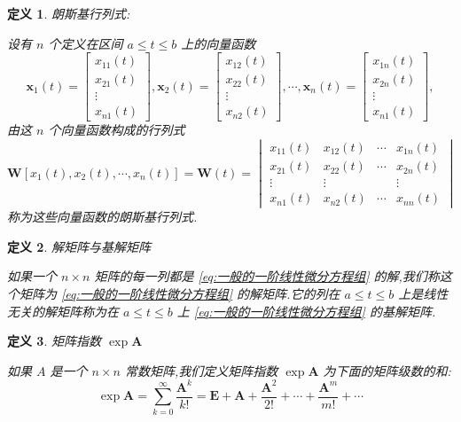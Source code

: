 \documentclass{ctexart}
\newtheorem{definition}{定义}[section]
\numberwithin{equation}{subsection}
\begin{document}
\begin{definition}朗斯基行列式:

        设有 $n$ 个定义在区间 $a\leqslant t\leqslant b$ 上的向量函数
        \[\boldsymbol{x}_{1}(t)=\left[\begin{array}{c}x_{11}(t) \\ x_{21}(t) \\ \vdots \\ x_{n 1}(t)\end{array}\right], \boldsymbol{x}_{2}(t)=\left[\begin{array}{c}x_{12}(t) \\ x_{22}(t) \\ \vdots \\ x_{n 2}(t)\end{array}\right], \cdots, \boldsymbol{x}_{n}(t)=\left[\begin{array}{c}x_{1 n}(t) \\ x_{2 n}(t) \\ \vdots \\ x_{n1}(t)\end{array}\right],\]
由这 $n$ 个向量函数构成的行列式
\[ \boldsymbol{W}\left[x_{1}(t), x_{2}(t), \cdots, x_{n}(t)\right]
=\boldsymbol{W}(t)=\begin{vmatrix}x_{11}(t) & x_{12}(t) & \cdots & x_{1 n}(t) \\ x_{21}(t) & x_{22}(t) & \cdots & x_{2 n}(t) \\ \vdots & \vdots & & \vdots \\ x_{n 1}(t) & x_{n 2}(t) & \cdots & x_{n n}(t)\end{vmatrix}\]
称为这些向量函数的朗斯基行列式.
\end{definition}
\begin{definition}解矩阵与基解矩阵
        
        如果一个 $n\times n$ 矩阵的每一列都是 \eqref{eq:一般的一阶线性微分方程组} 的解,我们称这个矩阵为 \eqref{eq:一般的一阶线性微分方程组} 的解矩阵.它的列在 $a\leqslant t\leqslant b$ 上是线性无关的解矩阵称为在 $a\leqslant t\leqslant b$ 上 \eqref{eq:一般的一阶线性微分方程组} 的基解矩阵.

\end{definition}
\begin{definition}矩阵指数 $\exp\boldsymbol{A}$

        如果 $A$ 是一个 $n\times n$ 常数矩阵,我们定义矩阵指数 $\exp\boldsymbol{A}$ 为下面的矩阵级数的和:\textcolor[rgb]{1,0,0}{
        \[
\exp \boldsymbol{A}=\sum_{k=0}^{\infty} \frac{\boldsymbol{A}^{k}}{k !}=\boldsymbol{E}+\boldsymbol{A}+\frac{\boldsymbol{A}^{2}}{2 !}+\cdots+\frac{\boldsymbol{A}^{m}}{m !}+\cdots
\]
        }
\end{definition}
\end{document}
